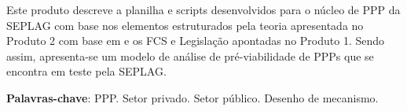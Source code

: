 
Este produto descreve a planilha e scripts desenvolvidos para o núcleo de PPP da SEPLAG com base nos elementos estruturados pela teoria apresentada no Produto 2 com base em  e os FCS e Legislação apontadas no Produto 1. Sendo assim, apresenta-se um modelo de análise de pré-viabilidade de PPPs que se encontra em teste pela SEPLAG.

\textbf{Palavras-chave}: PPP. Setor privado. Setor público. Desenho de mecanismo.
